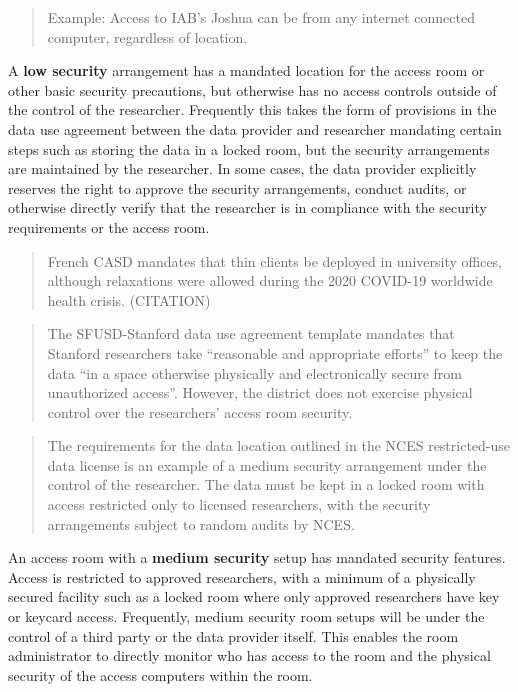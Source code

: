 \begin{quote}
Example: Access to IAB's Joshua can be from any internet connected
computer, regardless of location.
\end{quote}

A \textbf{low security} arrangement has a mandated location for the
access room or other basic security precautions, but otherwise has no
access controls outside of the control of the researcher. Frequently
this takes the form of provisions in the data use agreement between the
data provider and researcher mandating certain steps such as storing the
data in a locked room, but the security arrangements are maintained by
the researcher. In some cases, the data provider explicitly reserves the
right to approve the security arrangements, conduct audits, or otherwise
directly verify that the researcher is in compliance with the security
requirements or the access room.

\begin{quote}
French CASD mandates that thin clients be deployed in university
offices, although relaxations were allowed during the 2020 COVID-19
worldwide health crisis. (CITATION)
\end{quote}

\begin{quote}
The SFUSD-Stanford data use agreement template mandates that Stanford
researchers take ``reasonable and appropriate efforts'' to keep the data
``in a space otherwise physically and electronically secure from
unauthorized access''. However, the district does not exercise physical
control over the researchers' access room security.
\end{quote}

\begin{quote}
The requirements for the data location outlined in the NCES
restricted-use data license is an example of a medium security
arrangement under the control of the researcher. The data must be kept
in a locked room with access restricted only to licensed researchers,
with the security arrangements subject to random audits by NCES.
\end{quote}

An access room with a \textbf{medium security} setup has mandated
security features. Access is restricted to approved researchers, with a
minimum of a physically secured facility such as a locked room where
only approved researchers have key or keycard access. Frequently, medium
security room setups will be under the control of a third party or the
data provider itself. This enables the room administrator to directly
monitor who has access to the room and the physical security of the
access computers within the room.

